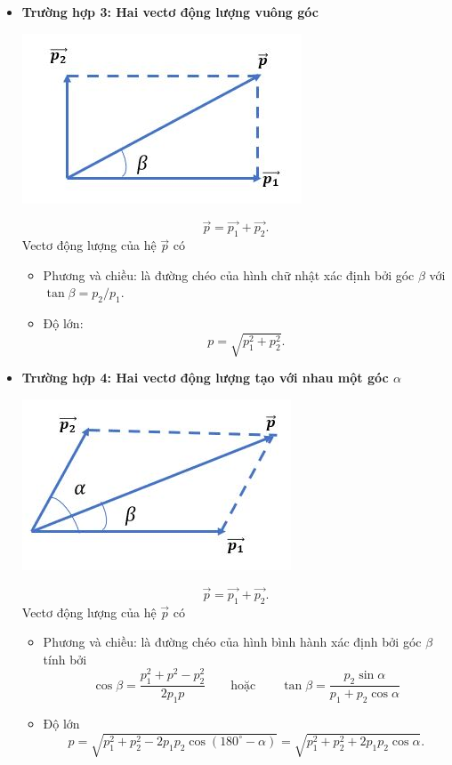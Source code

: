 \begin{itemize}
	\item \textbf{Trường hợp 3: Hai vectơ động lượng vuông góc}
	\begin{center}
		\includegraphics[scale=0.6]{../figs/VN10-PH-29-L-021-2-3.JPG}
	\end{center}
	\begin{equation*}
		\vec {p} = \vec {p_1} + \vec{p_2}.
	\end{equation*}
	Vectơ động lượng của hệ $\vec{p}$ có 
	\begin{itemize}
		\item Phương và chiều: là đường chéo của hình chữ nhật xác định bởi góc $\beta$ với $\tan \beta = {p_2}/{p_1}.$
		\item Độ lớn: $$p = \sqrt {p_1^2+p^2_2}.$$
	\end{itemize}
	
	\item \textbf{Trường hợp 4: Hai vectơ động lượng tạo với nhau một góc $\alpha$}
	\begin{center}
		\includegraphics[scale=0.6]{../figs/VN10-PH-29-L-021-2-4.JPG}
	\end{center}
	\begin{equation*}
		\vec {p} = \vec {p_1} + \vec{p_2}.
	\end{equation*}
	Vectơ động lượng của hệ $\vec{p}$ có 
	\begin{itemize}
		\item Phương và chiều: là đường chéo của hình bình hành xác định bởi góc $\beta$ tính bởi 
		\begin{equation*}
			\cos \beta = \dfrac  {p_1^2+p^2-p_2^2}{2p_1p} \qquad\text{hoặc}\qquad
			\tan\beta = \dfrac{p_2\sin\alpha}{p_1+p_2\cos\alpha}
		\end{equation*}
		\item Độ lớn  $$p = \sqrt{p^2_1+p^2_2 - 2p_1p_2 \cos (180^\circ - \alpha)} = \sqrt{p^2_1+p^2_2 + 2p_1p_2 \cos  \alpha}.$$
	\end{itemize}
	

\end{itemize}
